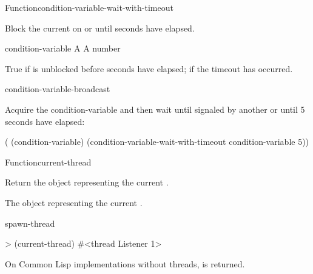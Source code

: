 \begin{functiondoc}{Function}{condition-variable-wait-with-timeout}%
  {}
%

\fnsyntax

\fnpurpose Block the current  on  or until
 seconds have elapsed.

\fnpackage {}

\fnmodule {}

\fnargs
\begin{args}{condition-variable}
 A 
\arg[seconds] A number
\end{args}

\fnreturns True if  is unblocked before
 seconds have elapsed; \nil{} if the timeout has occurred.

\fnerrors
\nocvlock{}
\par
\nothreads{}

\begin{alsos}{condition-variable-broadcast}
\end{alsos}

%
\fnexample Acquire the condition-variable  and then wait until
signaled by another  or until 5 seconds have elapsed:
\begin{example}
  ( (condition-variable)
    (condition-variable-wait-with-timeout condition-variable 5))
\end{example}

\end{functiondoc}


\begin{functiondoc}{Function}{current-thread}{\noargs{} 
    \returns{} }
%

\fnsyntax

\fnpurpose Return the object representing the current .

\fnpackage {}

\fnmodule {}

\fnreturns The object representing the current . 

\begin{alsos}{spawn-thread}
\end{alsos}

\fnexample
\begin{example}
> (current-thread)
#<thread Listener 1>
\end{example}

\fnnote On Common Lisp implementations without threads, \nil{} is returned.

\end{functiondoc}

